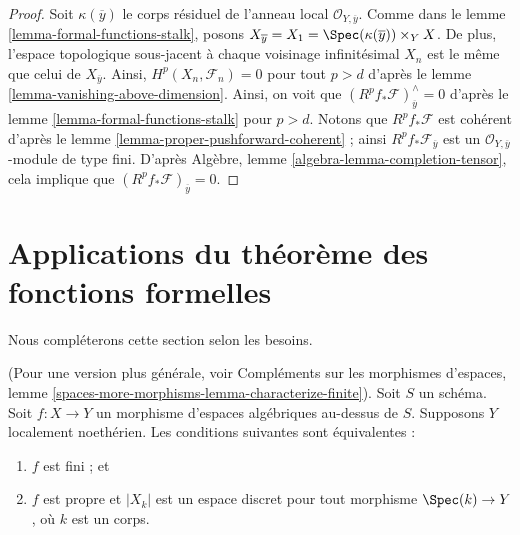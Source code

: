 \begin{proof}
Soit $\kappa(\overline{y})$ le corps résiduel de l'anneau
local $\mathcal{O}_{Y, \overline{y}}$. Comme dans le
lemme \ref{lemma-formal-functions-stalk},
posons $X_{\overline{y}} = X_1 = \Spec(\kappa(\overline{y})) \times_Y X$.
De plus, l'espace topologique sous-jacent à chaque voisinage
infinitésimal $X_n$ est le même que celui de $X_{\overline{y}}$.
Ainsi, $H^p(X_n, \mathcal{F}_n) = 0$ pour tout $p > d$ d'après le
lemme \ref{lemma-vanishing-above-dimension}.
Ainsi, on voit que $(R^pf_*\mathcal{F})_{\overline{y}}^\wedge = 0$
d'après le lemme \ref{lemma-formal-functions-stalk} pour $p > d$.
Notons que $R^pf_*\mathcal{F}$ est cohérent d'après le
lemme \ref{lemma-proper-pushforward-coherent} ;
ainsi $R^pf_*\mathcal{F}_{\overline{y}}$ est un
$\mathcal{O}_{Y, \overline{y}}$-module de type fini.
D'après Algèbre, lemme \ref{algebra-lemma-completion-tensor},
cela implique que $(R^pf_*\mathcal{F})_{\overline{y}} = 0$.
\end{proof}






\section{Applications du théorème des fonctions formelles}
\label{section-applications-formal-functions}

\noindent
Nous compléterons cette section selon les besoins.

\begin{lemma}
\label{lemma-characterize-finite}
(Pour une version plus générale, voir
Compléments sur les morphismes d'espaces, lemme
\ref{spaces-more-morphisms-lemma-characterize-finite}).
Soit $S$ un schéma.
Soit $f : X \to Y$ un morphisme d'espaces algébriques au-dessus de $S$.
Supposons $Y$ localement noethérien.
Les conditions suivantes sont équivalentes :
\begin{enumerate}
\item $f$ est fini ; et
\item $f$ est propre et $|X_k|$ est un espace discret
pour tout morphisme $\Spec(k) \to Y$, où $k$ est un corps.
\end{enumerate}
\end{lemma}

